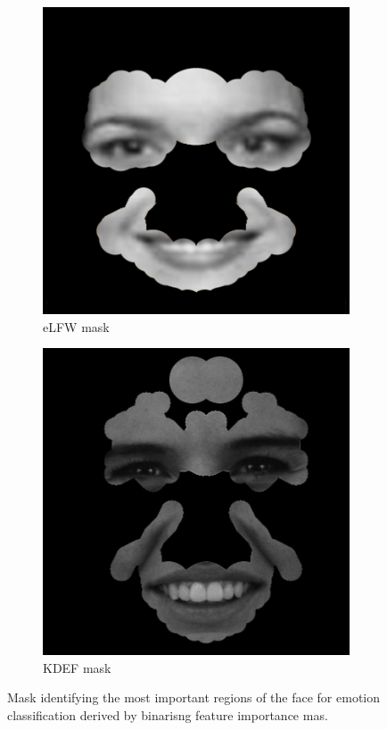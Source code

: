 \begin{figure}[tb]
	\centering
	\begin{subfigure}{.4\textwidth}
		\centering
		\includegraphics[width=.8\linewidth]{Chapter4/Figs/LWFmask.png}
		\caption{eLFW mask}
		\label{fig:LFWmask}
	\end{subfigure}%
	\begin{subfigure}{.4\textwidth}
		\centering
		\includegraphics[width=.8\linewidth]{Chapter4/Figs/KDEFmask.png}
		\caption{KDEF mask}
		\label{fig:KDEFmask}
	\end{subfigure}
	\caption{Mask identifying the most important regions of the face for emotion classification derived by binarisng feature importance mas.}
	\label{fig:KDEFandeLFW_masks}
\end{figure}
